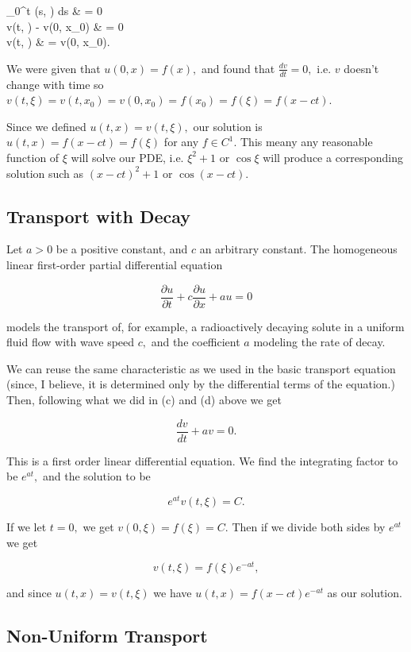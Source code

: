 \documentclass{article}
\begin{document}
\bal
\int_0^t (s, \xi) ds & = 0 \\
v(t, \xi) - v(0, x_0) & = 0 \\
v(t, \xi) & = v(0, x_0). \\
\eal

We were given that $u(0, x) = f(x),$ and found that $\frac{dv}{dt} = 0,$ i.e. $v$ doesn't change with time so $v(t, \xi) = v(t, x_0) = v(0, x_0) = f(x_0) = f(\xi) = f(x - ct).$

Since we defined $u(t,x) = v(t, \xi),$ our solution is $u(t,x) = f(x - ct) = f(\xi)$ for any $f \in C^1.$ This meany any reasonable function of $\xi$ will solve our PDE, i.e. $\xi^2 +1$ or $\cos{\xi}$ will produce a corresponding solution such as $(x-ct)^2 + 1$ or $\cos{(x - ct)}.$

\subsection{Transport with Decay}

Let $a > 0$ be a positive constant, and $c$ an arbitrary constant. The homogeneous linear first-order partial differential equation

\[ \frac{\partial u}{\partial t} + c \frac{\partial u }{\partial x} + a u = 0 \]

models the transport of, for example, a radioactively decaying solute in a uniform fluid flow with wave speed $c,$ and the coefficient $a$ modeling the rate of decay.

We can reuse the same characteristic as we used in the basic transport equation (since, I believe, it is determined only by the differential terms of the equation.) Then, following what we did in (c) and (d) above we get

\[ \frac{dv}{dt} + av = 0. \]

This is a first order linear differential equation. We find the integrating factor to be $e^{at},$ and the solution to be

\[ e^{at} v(t, \xi) = C. \tag{e} \]

If we let $t = 0, $ we get $v(0, \xi) = f(\xi) = C.$ Then if we divide both sides by $e^{at}$ we get

\[ v(t, \xi) = f(\xi)e^{-at}, \]

and since $u(t,x) = v(t, \xi)$ we have $u(t,x) = f(x - ct)e^{-at}$ as our solution.

\subsection{Non-Uniform Transport}
\end{document}
